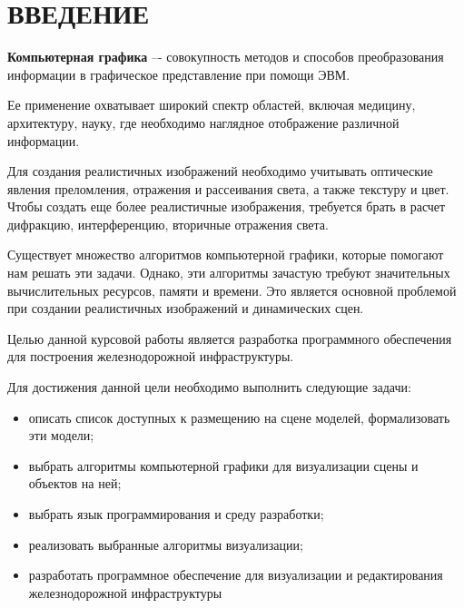 \begingroup
\titleformat{\chapter}[display]
  {\normalfont\bfseries\centering}{\chaptertitlename\ \thechapter}{18pt}{\centering}


\chapter*{ВВЕДЕНИЕ}

\endgroup
{}

\textbf{Компьютерная графика} –- совокупность методов и способов преобразования информации
в графическое представление при помощи ЭВМ.

Ее применение охватывает широкий спектр областей, включая медицину, 
архитектуру, науку, где необходимо наглядное отображение различной
информации.

Для создания реалистичных изображений необходимо учитывать оптические явления
преломления, отражения и рассеивания света, а также текстуру и цвет. Чтобы создать еще более
реалистичные изображения, требуется брать в расчет дифракцию, интерференцию, вторичные
отражения света.

Существует множество алгоритмов компьютерной графики, которые помогают нам решать
эти задачи. Однако, эти алгоритмы зачастую требуют значительных вычислительных ресурсов,
памяти и времени. Это является основной проблемой при создании реалистичных изображений и
динамических сцен.

Целью данной курсовой работы является разработка программного обеспечения для построения
железнодорожной инфраструктуры. 

Для достижения данной цели необходимо выполнить следующие задачи:
\begin{itemize}
    \item описать список доступных к размещению на сцене моделей, формализовать эти модели;
    \item выбрать алгоритмы компьютерной графики для визуализации сцены и
    объектов на ней;
    \item выбрать язык программирования и среду разработки;
    \item реализовать выбранные алгоритмы визуализации;
    \item разработать программное обеспечение для визуализации и редактирования
    железнодорожной инфраструктуры
\end{itemize}


